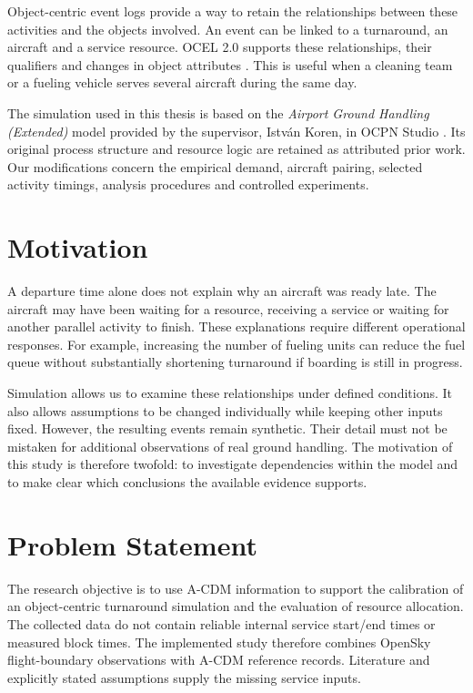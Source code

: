 Object-centric event logs provide a way to retain the relationships between these activities and the objects involved. An event can be linked to a turnaround, an aircraft and a service resource. OCEL 2.0 supports these relationships, their qualifiers and changes in object attributes \cite{ocel2}. This is useful when a cleaning team or a fueling vehicle serves several aircraft during the same day.

The simulation used in this thesis is based on the \emph{Airport Ground Handling (Extended)} model provided by the supervisor, Istv\'an Koren, in OCPN Studio \cite{ocpn_studio}. Its original process structure and resource logic are retained as attributed prior work. Our modifications concern the empirical demand, aircraft pairing, selected activity timings, analysis procedures and controlled experiments.

\section{Motivation}
A departure time alone does not explain why an aircraft was ready late. The aircraft may have been waiting for a resource, receiving a service or waiting for another parallel activity to finish. These explanations require different operational responses. For example, increasing the number of fueling units can reduce the fuel queue without substantially shortening turnaround if boarding is still in progress.

Simulation allows us to examine these relationships under defined conditions. It also allows assumptions to be changed individually while keeping other inputs fixed. However, the resulting events remain synthetic. Their detail must not be mistaken for additional observations of real ground handling. The motivation of this study is therefore twofold: to investigate dependencies within the model and to make clear which conclusions the available evidence supports.

\section{Problem Statement}
The research objective is to use A-CDM information to support the calibration of an object-centric turnaround simulation and the evaluation of resource allocation. The collected data do not contain reliable internal service start/end times or measured block times. The implemented study therefore combines OpenSky flight-boundary observations with A-CDM reference records. Literature and explicitly stated assumptions supply the missing service inputs.


